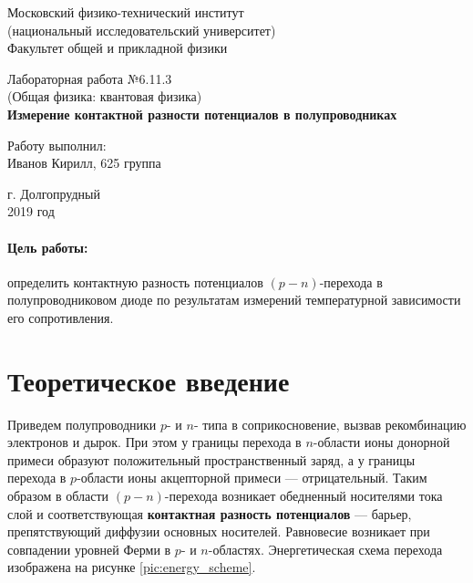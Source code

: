 \documentclass[12pt]{kiarticle} %
\begin{document}
	
	\begin{titlepage}
		\begin{center}
			\large 	Московский физико-технический институт \\
				(национальный исследовательский университет) \\
			Факультет общей и прикладной физики \\
			\vspace{0.2cm}
			
			\vspace{4.5cm}
			Лабораторная работа №6.11.3  \\ \vspace{0.2cm}
			\large (Общая физика: квантовая физика) \\ \vspace{0.2cm}
			\LARGE \textbf{  Измерение контактной разности потенциалов в полупроводниках }
		\end{center}
		\vspace{2.3cm} \large
		
		\begin{center}
			Работу выполнил: \\
			Иванов Кирилл,
			625 группа
			\vspace{10mm}		
			
		\end{center}
		
		\begin{center} \vspace{60mm}
			г. Долгопрудный \\
			2019 год
		\end{center}
	\end{titlepage}


	\paragraph*{Цель работы:} определить контактную разность потенциалов $(p-n)$-перехода в полупроводниковом диоде по результатам измерений температурной зависимости его сопротивления. 
	
	
	
	\section{Теоретическое введение}
	
	Приведем полупроводники $p$- и $n$- типа в соприкосновение, вызвав рекомбинацию электронов и дырок. При этом у границы перехода в $n$-области ионы донорной примеси образуют положительный пространственный заряд, а у границы перехода в $p$-области ионы акцепторной примеси --- отрицательный. Таким образом в области $(p-n)$-перехода возникает обедненный носителями тока слой и соответствующая \textbf{контактная разность потенциалов} --- барьер, препятствующий диффузии основных носителей. Равновесие возникает при совпадении уровней Ферми в $p$- и $n$-областях. Энергетическая схема перехода изображена на рисунке \ref{pic:energy_scheme}. 
	
\end{document}
